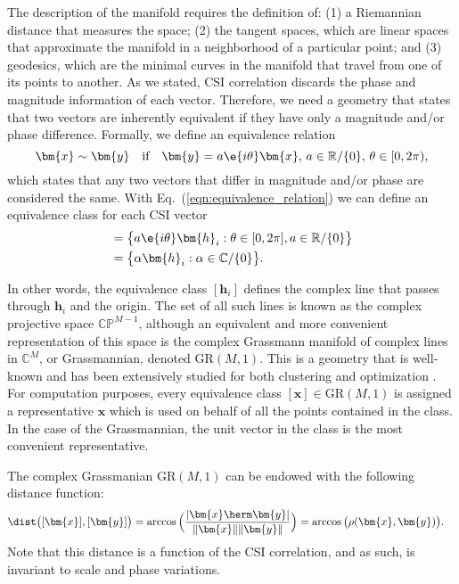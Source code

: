 The description of the manifold requires the definition of: (1) a Riemannian distance that measures the space; (2) the tangent spaces, which are linear spaces that approximate the manifold in a neighborhood of a particular point; and (3) geodesics, which are the minimal curves in the manifold that travel from one of its points to another.
As we stated, CSI correlation discards the phase and magnitude information of each vector. Therefore, we need a geometry that states that two vectors are inherently equivalent if they have only a magnitude and/or phase difference. Formally, we define an equivalence relation \begin{equation}
	\bm{x}\sim\bm{y}\quad\text{if}\quad\bm{y}=a\e{i\theta}\bm{x},\,a\in\mathbb{R}/\{0\},\,\theta\in[0,2\pi), \label{eqn:equivalence_relation}
\end{equation}  
which states that any two vectors that differ in magnitude and/or phase are considered the same. With Eq.~(\ref{eqn:equivalence_relation}) we can define an equivalence class for each CSI vector
\begin{align}
	[\bm{h}_i]&=\big\{a\e{i\theta}\bm{h}_i:\theta\in[0,2\pi], a\in\mathbb{R}/\{0\}\big\}\nonumber\\
	&=\big\{\alpha\bm{h}_i:\alpha\in\mathbb{C}/\{0\}\big\}.\label{eqn:equivalence_class}
\end{align}

In other words, the equivalence class $[\bm{h}_i]$ defines the complex line that passes through $\bm{h}_i$ and the origin. The set of all such lines is known as the complex projective space $\mathbb{CP}^{M-1}$, although an equivalent and more convenient representation of this space is the complex Grassmann manifold of complex lines in $\mathbb{C}^M$, or Grassmannian, denoted $\mathrm{GR}(M,1)$. This is a geometry that is well-known and has been extensively studied for both clustering and optimization \cite{Stiverson2019gkm,Edelman1999stiefel,Boumal2015grassmann}. 
For computation purposes, every equivalence class $[\bm{x}]\in\mathrm{GR}(M,1)$ is assigned a representative $\bm{x}$ which is used on behalf of all the points contained in the class.
In the case of the Grassmannian, the unit vector in the class is the most convenient representative.

The complex Grassmanian $\mathrm{GR}(M,1)$ can be endowed with the following distance function:
\begin{align}
	\dist\big([\bm{x}],[\bm{y}]\big)&=\arccos\Big(\frac{|\bm{x}\herm\bm{y}|}{\|\bm{x}\|\|\bm{y}\|}\Big)=\arccos\big(\rho(\bm{x},\bm{y})\big).
\end{align}
Note that this distance is a function of the CSI correlation, and as such, is invariant to scale and phase variations.

